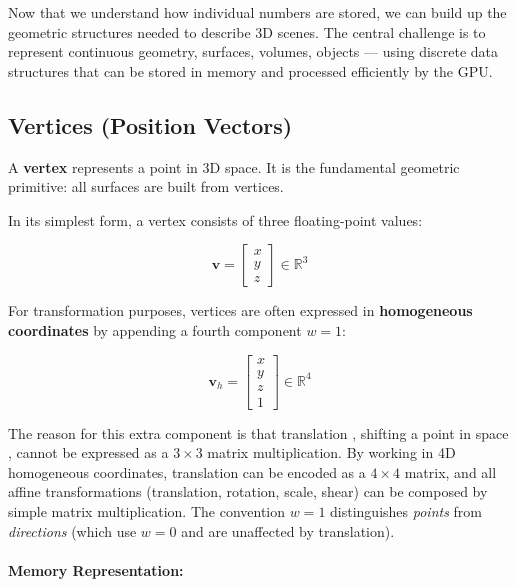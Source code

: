 \documentclass[11pt]{article}
\begin{document}
Now that we understand how individual numbers are stored, we can build up the geometric structures needed to describe 3D scenes. The central challenge is to represent continuous geometry, surfaces, volumes, objects --- using discrete data structures that can be stored in memory and processed efficiently by the GPU.

\subsection{Vertices (Position Vectors)}

A \textbf{vertex} represents a point in 3D space. It is the fundamental geometric primitive: all surfaces are built from vertices.

In its simplest form, a vertex consists of three floating-point values:

\begin{equation}
    \mathbf{v} =
    \begin{bmatrix}
        x \\
        y \\
        z
    \end{bmatrix}
    \in \mathbb{R}^3
\end{equation}

For transformation purposes, vertices are often expressed in \textbf{homogeneous coordinates} by appending a fourth component $w = 1$:

\begin{equation}
    \mathbf{v}_h =
    \begin{bmatrix}
        x \\
        y \\
        z \\
        1
    \end{bmatrix}
    \in \mathbb{R}^4
\end{equation}

The reason for this extra component is that translation , shifting a point in space , cannot be expressed as a $3 \times 3$ matrix multiplication. By working in 4D homogeneous coordinates, translation can be encoded as a $4 \times 4$ matrix, and all affine transformations (translation, rotation, scale, shear) can be composed by simple matrix multiplication. The convention $w = 1$ distinguishes \emph{points} from \emph{directions} (which use $w = 0$ and are unaffected by translation).

\paragraph{Memory Representation:}
\end{document}
